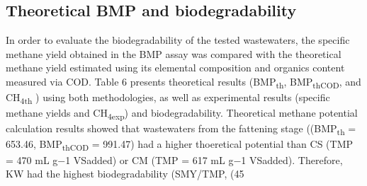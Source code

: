 \subsection{Theoretical BMP and biodegradability}
In order to evaluate the biodegradability of the tested wastewaters, the specific methane yield obtained in the BMP assay was compared with the theoretical methane yield estimated using its elemental composition and organics content measured via COD. Table 6 presents theoretical results (BMP\textsubscript{th}, BMP\textsubscript{thCOD}, and CH\textsubscript{4th} ) using both methodologies, as well as experimental results (specific methane yields and CH\textsubscript{4exp}) and  biodegradability.  Theoretical methane potential calculation results showed that wastewaters from the fattening stage ((BMP\textsubscript{th} = 653.46, BMP\textsubscript{thCOD} = 991.47) had a higher thoeretical potential than CS (TMP = 470 mL g−1 VSadded) or CM (TMP = 617 mL g−1 VSadded). Therefore, KW had the highest biodegradability (SMY/TMP, %
(45%
